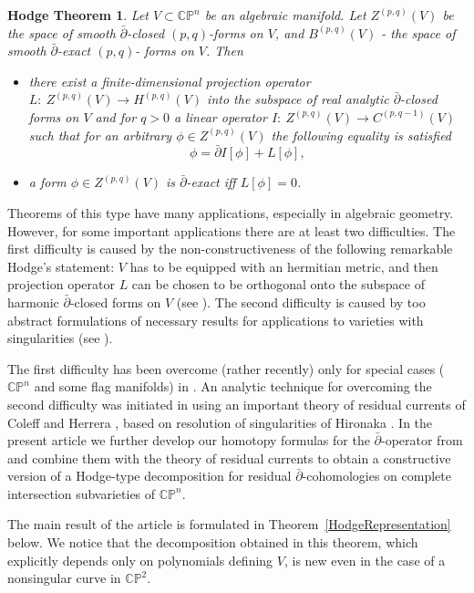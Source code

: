 \documentclass[11pt,reqno]{amsart}
\numberwithin{equation}{section}
\begin{document}
\newtheorem{Hthm}{Hodge Theorem}

\begin{Hthm}\label{ClassicalHodge}
Let $V\subset {{\mathbb C}}{{\mathbb P}}^n$ be an algebraic manifold. Let $Z^{(p,q)}(V)$ be the space
of smooth $\bar\partial$-closed $(p,q)$-forms on $V$, and $B^{(p,q)}(V)$ - the space
of smooth $\bar\partial$-exact $(p,q)$- forms on $V$. Then
\begin{itemize}
\item[(i)] there exist a finite-dimensional projection operator
$L:\ Z^{(p,q)}(V) \to H^{(p,q)}(V)$ into the subspace
of real analytic $\bar\partial$-closed forms on $V$ and for $q>0$ a linear operator
$I:\ Z^{(p,q)}(V) \to C^{(p,q-1)}(V)$ such that for an arbitrary $\phi\in Z^{(p,q)}(V)$ the
following equality is satisfied
$$\phi=\bar\partial I[\phi]+L[\phi],$$
\item[(ii)] a form $\phi\in Z^{(p,q)}(V)$ is $\bar\partial$-exact iff $L[\phi]=0$.
\end{itemize}
\end{Hthm}

\indent
Theorems of this type have many applications, especially in algebraic geometry.
However, for some important applications there are at least two difficulties. The first difficulty
is caused by the non-constructiveness of the following remarkable Hodge's
statement: $V$ has to be equipped with an
hermitian metric, and then projection operator $L$ can be chosen to be orthogonal onto the subspace of harmonic $\bar\partial$-closed forms on $V$ (see \cite{Ho, GH, BDIP, V}). The
second difficulty is caused by too abstract formulations of necessary results for applications to varieties with singularities (see \cite{Dl, Gr, Ha, RR}).

\indent
The first difficulty has been overcome (rather recently) only for special cases
(${{\mathbb C}}{{\mathbb P}}^n$ and some flag manifolds) in \cite{HP1, Bn, Go, GSS, SS}.
An analytic technique for overcoming the second difficulty was initiated in \cite{HP2}
using an important theory of residual currents of Coleff and Herrera \cite{CH},
based on resolution of singularities of Hironaka \cite{Hi}.
In the present article we further develop our homotopy formulas for the $\bar\partial$-operator
from \cite{HP1} and combine them with the theory of residual currents to obtain a constructive
version of a Hodge-type decomposition for residual $\bar\partial$-cohomologies on complete
intersection subvarieties of ${{\mathbb C}}{{\mathbb P}}^n$.

\indent
The main result of the article is formulated in Theorem~\ref{HodgeRepresentation}
below. We notice that the decomposition obtained in this theorem, which explicitly depends
only on polynomials defining $V$, is new even in the case of a nonsingular curve in ${{\mathbb C}}{{\mathbb P}}^2$.
\end{document}
